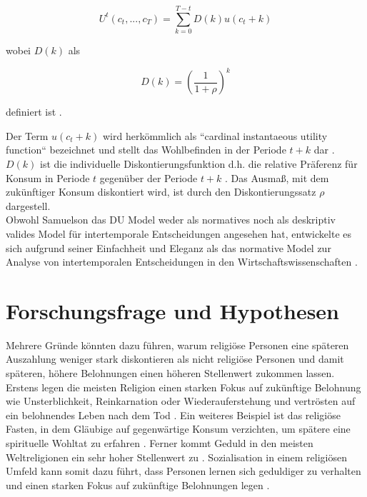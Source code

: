 \documentclass[11pt,a4paper]{article}
\begin{document}
\begin{equation}
U^t(c_t,...,c_T) = \sum^{T - t}_{k=0}D(k)u(c_t+k)
\end{equation}


wobei $D(k)$ als 
 
\begin{equation}
D(k) = (\frac{1}{1+\rho})^k
\end{equation}

definiert ist \parencite{frederick2002time}.\

Der Term $u(c_t+k)$ wird herkömmlich als “cardinal instantaeous utility function“ bezeichnet und stellt das Wohlbefinden in der Periode $t+k$ dar \parencite{frederick2002time}. $D(k)$ ist die individuelle Diskontierungsfunktion d.h. die relative Präferenz für Konsum in Periode $t$ gegenüber der Periode $t+k$ \parencite{frederick2002time}. Das Ausmaß, mit dem zukünftiger Konsum diskontiert wird, ist durch den Diskontierungssatz $\rho$ dargestell\parencite{frederick2002time}.\\

Obwohl Samuelson das DU Model weder als normatives noch als deskriptiv valides Model für intertemporale Entscheidungen angesehen hat, entwickelte es sich aufgrund seiner Einfachheit und Eleganz als das normative Model zur Analyse von intertemporalen Entscheidungen in den Wirtschaftswissenschaften \parencite{frederick2002time}. 

\section{Forschungsfrage und Hypothesen}
Mehrere Gründe könnten dazu führen, warum religiöse Personen eine späteren Auszahlung weniger stark diskontieren als nicht religiöse Personen und damit späteren, höhere Belohnungen einen höheren Stellenwert zukommen lassen.\\

Erstens legen die meisten Religion einen starken Fokus auf zukünftige Belohnung wie Unsterblichkeit, Reinkarnation oder Wiederauferstehung und vertrösten auf ein belohnendes Leben nach dem Tod \parencite{carter2012religious}. Ein weiteres Beispiel ist das religiöse Fasten, in dem Gläubige auf gegenwärtige Konsum verzichten, um spätere eine spirituelle Wohltat zu erfahren \parencite{thornton2015divine}. Ferner kommt Geduld in den meisten Weltreligionen ein sehr hoher Stellenwert zu \parencite{carter2012religious}. Sozialisation in einem religiösen Umfeld kann somit dazu führt, dass Personen lernen sich geduldiger zu verhalten und einen starken Fokus auf zukünftige Belohnungen legen \parencite{carter2012religious}.\\
\end{document}
